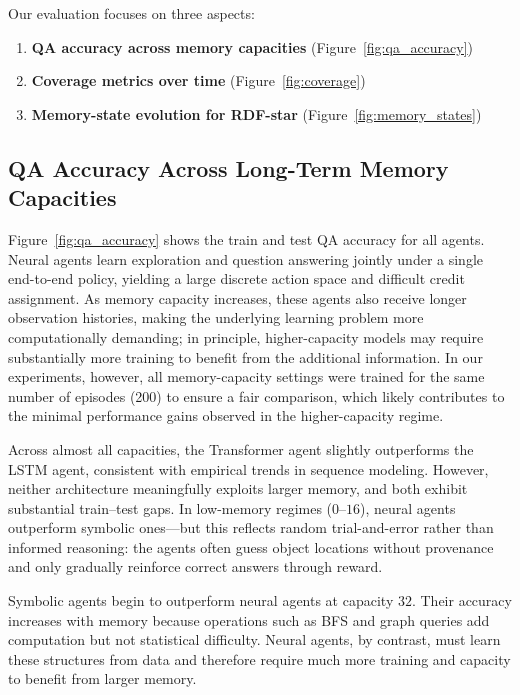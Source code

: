 \documentclass[11pt]{article}
\begin{document}
Our evaluation focuses on three aspects:

\begin{enumerate}
    \item \textbf{QA accuracy across memory capacities} (Figure~\ref{fig:qa_accuracy})
    \item \textbf{Coverage metrics over time} (Figure~\ref{fig:coverage})
    \item \textbf{Memory-state evolution for RDF-star} (Figure~\ref{fig:memory_states})
\end{enumerate}

\subsection{QA Accuracy Across Long-Term Memory Capacities}

Figure~\ref{fig:qa_accuracy} shows the train and test QA accuracy for all agents.
Neural agents learn exploration and question answering jointly under a single end-to-end policy, yielding a large discrete action space and difficult credit assignment. As memory capacity increases, these agents also receive longer observation histories, making the underlying learning problem more computationally demanding; in principle, higher-capacity models may require substantially more training to benefit from the additional information. In our experiments, however, all memory-capacity settings were trained for the same number of episodes (200) to ensure a fair comparison, which likely contributes to the minimal performance gains observed in the higher-capacity regime.


Across almost all capacities, the Transformer agent slightly outperforms the LSTM agent, consistent with empirical trends in sequence modeling. However, neither architecture meaningfully exploits larger memory, and both exhibit substantial train--test gaps. In low-memory regimes ($0$--$16$), neural agents outperform symbolic ones---but this reflects random trial-and-error rather than informed reasoning: the agents often guess object locations without provenance and only gradually reinforce correct answers through reward.

Symbolic agents begin to outperform neural agents at capacity $32$. Their
accuracy increases with memory because operations such as BFS and graph queries
add computation but not statistical difficulty. Neural agents, by contrast, must
learn these structures from data and therefore require much more training and
capacity to benefit from larger memory.
\end{document}

